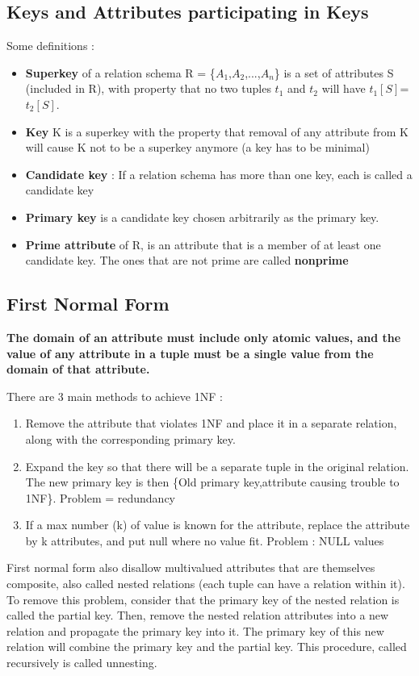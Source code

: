 \subsection{Keys and Attributes participating in Keys}
Some definitions :
\begin{itemize}
\item \textbf{Superkey} of a relation schema R = \{$A_1$,$A_2$,...,$A_n$\} is a set of attributes S (included in R), with property that no two tuples $t_1$ and $t_2$ will have $t_1[S]$=$t_2[S]$.
\item \textbf{Key} K is a superkey with the property that removal of any attribute from K will cause K not to be a superkey anymore (a key has to be minimal)
\item \textbf{Candidate key} : If a relation schema has more than one key, each is called a candidate key
\item \textbf{Primary key} is a candidate key chosen arbitrarily as the primary key.
\item \textbf{Prime attribute} of R, is an attribute that is a member of at least one candidate key. The ones that are not prime are called \textbf{nonprime}
\end{itemize}

\subsection{First Normal Form}
\begin{center}
\textbf{The domain of an attribute must include only atomic values, and the value of any attribute in a tuple must be a single value from the domain of that attribute.}
\end{center}

There are 3 main methods to achieve 1NF :
\begin{enumerate}
  \item Remove the attribute that violates 1NF and place it in a separate relation, along with the corresponding primary key.
  \item Expand the key so that there will be a separate tuple in the original relation. The new primary key is then \{Old primary key,attribute causing trouble to 1NF\}. Problem = redundancy
  \item If a max number (k) of value is known for the attribute, replace the attribute by k attributes, and put null where no value fit. Problem : NULL values\\
\end{enumerate}
First normal form also disallow multivalued attributes that are themselves composite, also called nested relations (each tuple can have a relation within it). To remove this problem, consider that the primary key of the nested relation is called the partial key. Then, remove the nested relation attributes into a new relation and propagate the primary key into it. The primary key of this new relation will combine the primary key and the partial key. This procedure, called recursively is called unnesting.

